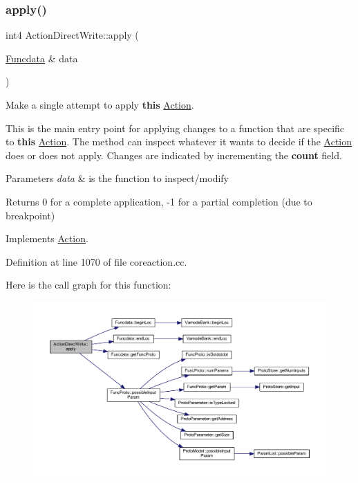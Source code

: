 \subsubsection{\texorpdfstring{apply()}{apply()}}
{\footnotesize\ttfamily int4 Action\+Direct\+Write\+::apply (\begin{DoxyParamCaption}\item[{\mbox{\hyperlink{class_funcdata}{Funcdata}} \&}]{data }\end{DoxyParamCaption})\hspace{0.3cm}{\ttfamily [virtual]}}



Make a single attempt to apply {\bfseries{this}} \mbox{\hyperlink{class_action}{Action}}. 

This is the main entry point for applying changes to a function that are specific to {\bfseries{this}} \mbox{\hyperlink{class_action}{Action}}. The method can inspect whatever it wants to decide if the \mbox{\hyperlink{class_action}{Action}} does or does not apply. Changes are indicated by incrementing the {\bfseries{count}} field. 
\begin{DoxyParams}{Parameters}
{\em data} & is the function to inspect/modify \\
\hline
\end{DoxyParams}
\begin{DoxyReturn}{Returns}
0 for a complete application, -\/1 for a partial completion (due to breakpoint) 
\end{DoxyReturn}


Implements \mbox{\hyperlink{class_action_aac1c3999d6c685b15f5d9765a4d04173}{Action}}.



Definition at line 1070 of file coreaction.\+cc.

Here is the call graph for this function\+:
\nopagebreak
\begin{figure}[H]
\begin{center}
\leavevmode
\includegraphics[width=350pt]{class_action_direct_write_a02ef8c3c9a53549db52478cd566e320f_cgraph}
\end{center}
\end{figure}
\mbox{\label{class_action_direct_write_adbb35f944b5ae30faf45797be1c6965d}} 
